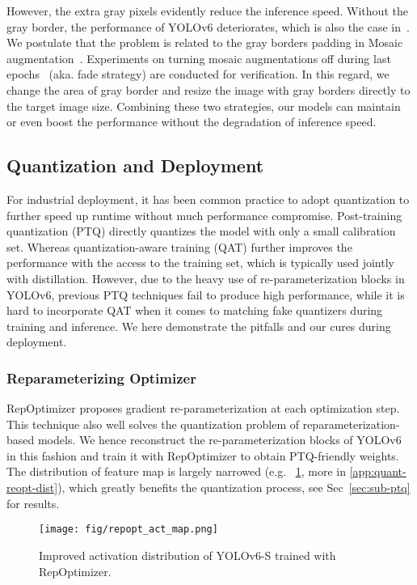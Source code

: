 \documentclass[10pt,twocolumn,letterpaper]{article}
\begin{document}
 However, the extra gray pixels evidently reduce the inference speed. Without the gray border, the performance of YOLOv6 deteriorates, which is also the case in~\cite{yolov5,wang2022yolov7}. We postulate that the problem is related to the gray borders padding in Mosaic augmentation~\cite{bochkovskiy2020yolov4,yolov5}. Experiments on turning mosaic augmentations off during last epochs~\cite{ge2021yolox} (aka. fade strategy) are conducted for verification. In this regard, we change the area of gray border and resize the image with gray borders directly to the target image size. Combining these two strategies, our models can maintain or even boost the performance without the degradation of inference speed.


\subsection{Quantization and Deployment}\label{sec:quant-deploy}
For industrial deployment, it has been common practice to adopt quantization to further speed up runtime without much performance compromise. Post-training quantization (PTQ) directly quantizes the model with only a small calibration set. Whereas quantization-aware training (QAT) further improves the performance with the access to the training set, which is typically used jointly with distillation. However, due to the heavy use of re-parameterization blocks in YOLOv6, previous PTQ techniques fail to produce high performance, while it is hard to incorporate QAT when it comes to matching fake quantizers during training and inference. We here demonstrate the pitfalls and our cures during deployment.

\subsubsection{Reparameterizing Optimizer}

RepOptimizer \cite{ding2022re} proposes gradient re-parameterization at each optimization step.  This technique also well solves the quantization problem of reparameterization-based models. We hence reconstruct the re-parameterization blocks of YOLOv6 in this fashion and train it with RepOptimizer to obtain PTQ-friendly weights. The distribution of feature map is largely narrowed (e.g. ~\cref{fig:repopt_act_map}, more in \ref{app:quant-reopt-dist}), which greatly benefits the quantization process, see Sec~\ref{sec:sub-ptq} for results.

  
    \begin{figure}[htp]
    \centering
    \texttt{[image: fig/repopt\_act\_map.png]}
    \caption{Improved activation distribution of YOLOv6-S trained with RepOptimizer.}
    \label{fig:repopt_act_map}
  \end{figure}
\end{document}
